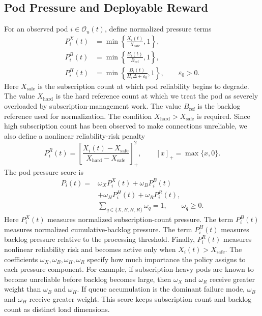 \subsection{Pod Pressure and Deployable Reward}

For an observed pod $i\in\mathcal{O}_u(t)$, define normalized pressure terms
\begin{align}
	P^X_i(t) &= \min\left\{\frac{X_i(t)}{X_{\mathrm{safe}}},1\right\},\\
	P^B_i(t) &= \min\left\{\frac{B_i(t)}{B_{\mathrm{ref}}},1\right\},\\
	P^H_i(t) &= \min\left\{\frac{B_i(t)}{H_i\Delta+\varepsilon_0},1\right\},
	\qquad \varepsilon_0>0.
\end{align}
Here $X_{\mathrm{safe}}$ is the subscription count at which pod reliability begins to
degrade. The value $X_{\mathrm{hard}}$ is the hard reference count at which we treat the
pod as severely overloaded by subscription-management work.
The value $B_{\mathrm{ref}}$ is the backlog reference used for normalization. The condition
$X_{\mathrm{hard}}>X_{\mathrm{safe}}$ is required. Since high subscription count has been
observed to make connections unreliable, we also define a nonlinear
reliability-risk penalty
\begin{equation}
	P^R_i(t)=
	\left[
	\frac{X_i(t)-X_{\mathrm{safe}}}
	{X_{\mathrm{hard}}-X_{\mathrm{safe}}}
	\right]_+^2,
	\qquad [x]_+=\max\{x,0\}.
\end{equation}
The pod pressure score is
\begin{align}
	P_i(t)=
	&\omega_X P^X_i(t)
	+\omega_B P^B_i(t) \nonumber\\
	&+\omega_H P^H_i(t)
	+\omega_R P^R_i(t),
	\label{eq:pod_pressure}\\
	&\sum_{q\in\{X,B,H,R\}}\omega_q=1,\qquad \omega_q\geq 0. \nonumber
\end{align}
Here $P^X_i(t)$ measures normalized subscription-count pressure.
The term $P^B_i(t)$ measures normalized cumulative-backlog pressure.
The term $P^H_i(t)$ measures backlog pressure relative to the processing threshold.
Finally, $P^R_i(t)$ measures nonlinear reliability risk and becomes active only
when $X_i(t)>X_{\mathrm{safe}}$. The coefficients
$\omega_X,\omega_B,\omega_H,\omega_R$ specify how much importance the policy
assigns to each pressure component. For example, if subscription-heavy pods are
known to become unreliable before backlog becomes large, then $\omega_X$ and
$\omega_R$ receive greater weight than $\omega_B$ and $\omega_H$. If queue
accumulation is the dominant failure mode, $\omega_B$ and $\omega_H$
receive greater weight. This score keeps subscription count and backlog
count as distinct load dimensions.

